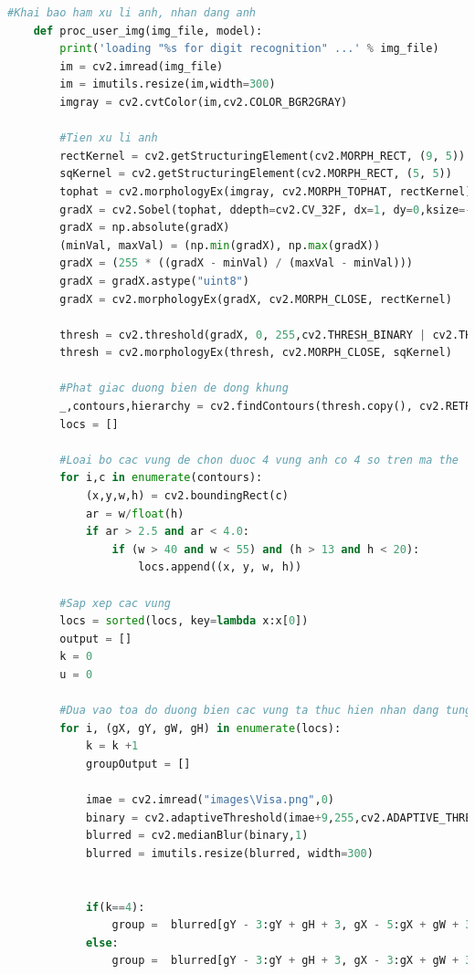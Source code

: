 \begin{lstlisting}[language=Python, caption=Recognition Visa]
    #Khai bao ham xu li anh, nhan dang anh
    def proc_user_img(img_file, model):
        print('loading "%s for digit recognition" ...' % img_file)
        im = cv2.imread(img_file)  
        im = imutils.resize(im,width=300)  
        imgray = cv2.cvtColor(im,cv2.COLOR_BGR2GRAY)
    
        #Tien xu li anh 
        rectKernel = cv2.getStructuringElement(cv2.MORPH_RECT, (9, 5))
        sqKernel = cv2.getStructuringElement(cv2.MORPH_RECT, (5, 5))
        tophat = cv2.morphologyEx(imgray, cv2.MORPH_TOPHAT, rectKernel)
        gradX = cv2.Sobel(tophat, ddepth=cv2.CV_32F, dx=1, dy=0,ksize=-1)
        gradX = np.absolute(gradX)
        (minVal, maxVal) = (np.min(gradX), np.max(gradX))
        gradX = (255 * ((gradX - minVal) / (maxVal - minVal)))
        gradX = gradX.astype("uint8")
        gradX = cv2.morphologyEx(gradX, cv2.MORPH_CLOSE, rectKernel)
        
        thresh = cv2.threshold(gradX, 0, 255,cv2.THRESH_BINARY | cv2.THRESH_OTSU)[1]
        thresh = cv2.morphologyEx(thresh, cv2.MORPH_CLOSE, sqKernel)
    
        #Phat giac duong bien de dong khung 
        _,contours,hierarchy = cv2.findContours(thresh.copy(), cv2.RETR_EXTERNAL, cv2.CHAIN_APPROX_SIMPLE)
        locs = []
    
        #Loai bo cac vung de chon duoc 4 vung anh co 4 so tren ma the
        for i,c in enumerate(contours):
            (x,y,w,h) = cv2.boundingRect(c)
            ar = w/float(h)
            if ar > 2.5 and ar < 4.0:
                if (w > 40 and w < 55) and (h > 13 and h < 20):
                    locs.append((x, y, w, h))
    
        #Sap xep cac vung
        locs = sorted(locs, key=lambda x:x[0])
        output = [] 
        k = 0
        u = 0
    
        #Dua vao toa do duong bien cac vung ta thuc hien nhan dang tung vung
        for i, (gX, gY, gW, gH) in enumerate(locs):
            k = k +1
            groupOutput = []
    
            imae = cv2.imread("images\Visa.png",0)
            binary = cv2.adaptiveThreshold(imae+9,255,cv2.ADAPTIVE_THRESH_GAUSSIAN_C,cv2.THRESH_BINARY,121,9)
            blurred = cv2.medianBlur(binary,1)
            blurred = imutils.resize(blurred, width=300)
    
            
            if(k==4):
                group =  blurred[gY - 3:gY + gH + 3, gX - 5:gX + gW + 3]
            else:
                group =  blurred[gY - 3:gY + gH + 3, gX - 3:gX + gW + 3]
                

\end{lstlisting}
